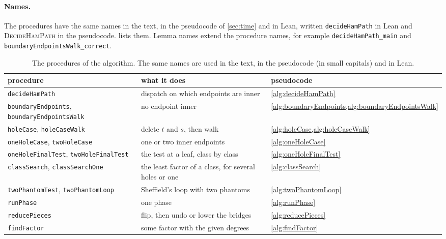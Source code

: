 \documentclass[11pt]{article}
\theoremstyle{plain}
\theoremstyle{definition}
\theoremstyle{remark}
\newcommand{\lean}[1]{\texttt{#1}}
\begin{document}
\paragraph{Names.}
The procedures have the same names in the text, in the pseudocode of \cref{sec:time} and in Lean,
written \lean{decideHamPath} in Lean and \textsc{DecideHamPath} in the pseudocode.
 lists them.
Lemma names extend the procedure names, for example \lean{decideHamPath\_main} and
\lean{boundaryEndpointsWalk\_correct}.

\begin{table}[t]
\centering
\small
\begin{tabular}{@{}>{\raggedright\arraybackslash}p{5.6cm}>{\raggedright\arraybackslash}p{6.6cm}>{\raggedright\arraybackslash}p{3.3cm}@{}}
\toprule
procedure & what it does & pseudocode \\
\midrule
\lean{decideHamPath} & dispatch on which endpoints are inner & \cref{alg:decideHamPath} \\
\lean{boundaryEndpoints}, \lean{boundaryEndpointsWalk} & no endpoint inner & \cref{alg:boundaryEndpoints,alg:boundaryEndpointsWalk} \\
\lean{holeCase}, \lean{holeCaseWalk} & delete $t$ and $s$, then walk & \cref{alg:holeCase,alg:holeCaseWalk} \\
\lean{oneHoleCase}, \lean{twoHoleCase} & one or two inner endpoints & \cref{alg:oneHoleCase} \\
\lean{oneHoleFinalTest}, \lean{twoHoleFinalTest} & the test at a leaf, class by class & \cref{alg:oneHoleFinalTest} \\
\lean{classSearch}, \lean{classSearchOne} & the least factor of a class, for several holes or one & \cref{alg:classSearch} \\
\lean{twoPhantomTest}, \lean{twoPhantomLoop} & Sheffield's loop with two phantoms & \cref{alg:twoPhantomLoop} \\
\lean{runPhase} & one phase & \cref{alg:runPhase} \\
\lean{reducePieces} & flip, then undo or lower the bridges & \cref{alg:reducePieces} \\
\lean{findFactor} & some factor with the given degrees & \cref{alg:findFactor} \\
\bottomrule
\end{tabular}
\caption{The procedures of the algorithm.
The same names are used in the text, in the pseudocode (in small capitals) and in Lean.}
\label{tab:names}
\end{table}
\end{document}
